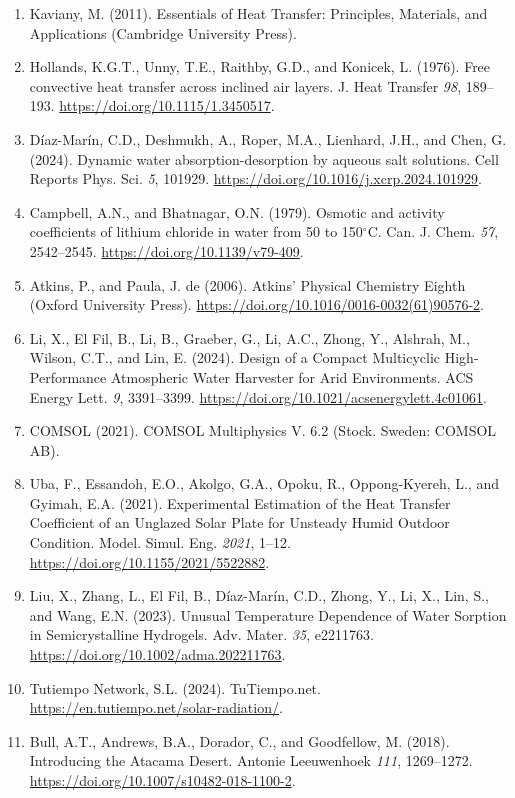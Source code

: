 \documentclass[11pt]{article}
\begin{document}
\begin{enumerate}[leftmargin=2em,itemsep=0.25em]
\item Kaviany, M. (2011). Essentials of Heat Transfer: Principles, Materials, and Applications (Cambridge University Press).
\item Hollands, K.G.T., Unny, T.E., Raithby, G.D., and Konicek, L. (1976). Free convective heat transfer across inclined air layers. J. Heat Transfer \textit{98}, 189--193. \url{https://doi.org/10.1115/1.3450517}.
\item Díaz-Marín, C.D., Deshmukh, A., Roper, M.A., Lienhard, J.H., and Chen, G. (2024). Dynamic water absorption-desorption by aqueous salt solutions. Cell Reports Phys. Sci. \textit{5}, 101929. \url{https://doi.org/10.1016/j.xcrp.2024.101929}.
\item Campbell, A.N., and Bhatnagar, O.N. (1979). Osmotic and activity coefficients of lithium chloride in water from 50 to 150$^{\circ}$C. Can. J. Chem. \textit{57}, 2542--2545. \url{https://doi.org/10.1139/v79-409}.
\item Atkins, P., and Paula, J. de (2006). Atkins' Physical Chemistry Eighth (Oxford University Press). \url{https://doi.org/10.1016/0016-0032(61)90576-2}.
\item Li, X., El Fil, B., Li, B., Graeber, G., Li, A.C., Zhong, Y., Alshrah, M., Wilson, C.T., and Lin, E. (2024). Design of a Compact Multicyclic High-Performance Atmospheric Water Harvester for Arid Environments. ACS Energy Lett. \textit{9}, 3391--3399. \url{https://doi.org/10.1021/acsenergylett.4c01061}.
\item COMSOL (2021). COMSOL Multiphysics\textregistered{} V. 6.2 (Stock. Sweden: COMSOL AB).
\item Uba, F., Essandoh, E.O., Akolgo, G.A., Opoku, R., Oppong-Kyereh, L., and Gyimah, E.A. (2021). Experimental Estimation of the Heat Transfer Coefficient of an Unglazed Solar Plate for Unsteady Humid Outdoor Condition. Model. Simul. Eng. \textit{2021}, 1--12. \url{https://doi.org/10.1155/2021/5522882}.
\item Liu, X., Zhang, L., El Fil, B., Díaz-Marín, C.D., Zhong, Y., Li, X., Lin, S., and Wang, E.N. (2023). Unusual Temperature Dependence of Water Sorption in Semicrystalline Hydrogels. Adv. Mater. \textit{35}, e2211763. \url{https://doi.org/10.1002/adma.202211763}.
\item Tutiempo Network, S.L. (2024). TuTiempo.net. \url{https://en.tutiempo.net/solar-radiation/}.
\item Bull, A.T., Andrews, B.A., Dorador, C., and Goodfellow, M. (2018). Introducing the Atacama Desert. Antonie Leeuwenhoek \textit{111}, 1269--1272. \url{https://doi.org/10.1007/s10482-018-1100-2}.

\end{enumerate}
\end{document}
